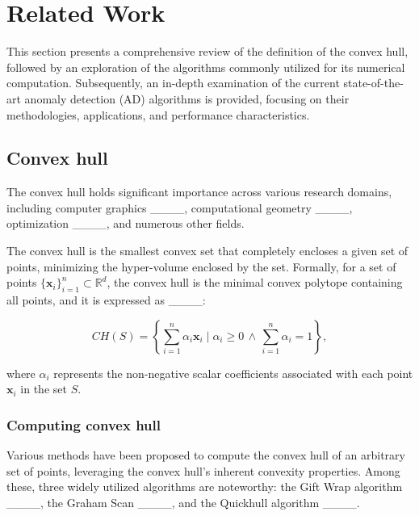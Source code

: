 \section{Related Work}
\label{sec:related_work}

This section presents a comprehensive review of the definition of the convex hull, followed by an exploration of the algorithms commonly utilized for its numerical computation. Subsequently, an in-depth examination of the current state-of-the-art anomaly detection (AD) algorithms is provided, focusing on their methodologies, applications, and performance characteristics.

\subsection{Convex hull}
\label{sec:rw_convex_hull}

The convex hull holds significant importance across various research domains, including computer graphics ____, computational geometry ____, optimization ____, and numerous other fields.



The convex hull is the smallest convex set that completely encloses a given set of points, minimizing the hyper-volume enclosed by the set. Formally, for a set of points \( \{\boldsymbol{x}_i\}_{i=1}^n \subset \mathbb{R}^d \), the convex hull is the minimal convex polytope containing all points, and it is expressed as ____:

\begin{equation}
CH(S) = \left\{ \sum_{i=1}^{n} \alpha_i \boldsymbol{x}_i \mid \alpha_i \geq 0 \, \wedge \, \sum_{i=1}^{n} \alpha_i = 1 \right\},
\end{equation}

where \( \alpha_i \) represents the non-negative scalar coefficients associated with each point \( \boldsymbol{x}_i \) in the set \( S \).


\subsubsection{Computing convex hull}
Various methods have been proposed to compute the convex hull of an arbitrary set of points, leveraging the convex hull's inherent convexity properties. Among these, three widely utilized algorithms are noteworthy: the Gift Wrap algorithm ____, the Graham Scan ____, and the Quickhull algorithm ____.


